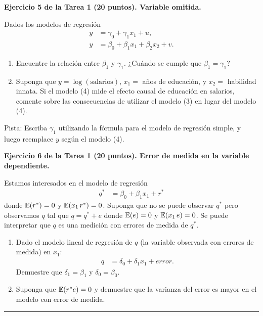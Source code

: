 \documentclass[letterpaper,11pt]{article}
\begin{document}
\vspace{1em}

\noindent\textbf{Ejercicio 5 de la Tarea 1 (20 puntos). Variable omitida.}

Dados los modelos de regresión
\begin{align}
    y &= \gamma_0+\gamma_1 x_{1}+u,\\
    y &= \beta_0 + \beta_1 x_{1}+\beta_2 x_{2}+v.
\end{align}
\begin{enumerate}
    \item Encuentre la relación entre $\beta_1$ y $\gamma_1$. ¿Cuándo se cumple que
    $\beta_1=\gamma_1$?
    \item Suponga que $y = \log(\text{salarios})$, $x_{1}=$ años de educación, y $x_{2}=$
    habilidad innata. Si el modelo (4) mide el efecto causal de educación en salarios, comente
    sobre las consecuencias de utilizar el modelo (3) en lugar del modelo (4).
\end{enumerate}
Pista: Escriba $\gamma_1$ utilizando la fórmula para el modelo de regresión simple, y luego
reemplace $y$ según el modelo (4).

\vspace{1em}

\noindent\textbf{Ejercicio 6 de la Tarea 1 (20 puntos). Error de medida en la variable
dependiente.}

Estamos interesados en el modelo de regresión
\begin{align*}
    q^* &= \beta_0 + \beta_1 x_{1}+r^*
\end{align*}
donde $\operatorname{\mathbb{E}}(r^*)=0$ y $\operatorname{\mathbb{E}}(x_1\,r^*)=0$. Suponga que no se puede observar $q^*$ pero observamos $q$
tal que $q=q^*+e$ donde $\operatorname{\mathbb{E}}(e)=0$ y $\operatorname{\mathbb{E}}(x_1\,e)=0$. Se puede interpretar que $q$ es una medición
con errores de medida de $q^*$.
\begin{enumerate}
    \item Dado el modelo lineal de regresión de $q$ (la variable observada con errores de
    medida) en $x_1$:
\begin{align*}
    q &= \delta_0 + \delta_1 x_{1}+error.
\end{align*}
    Demuestre que $\delta_1=\beta_1$ y $\delta_0=\beta_0$.
    \item Suponga que $\operatorname{\mathbb{E}}(r^* e)=0$ y demuestre que la varianza del error es mayor en el modelo
    con error de medida.\\
\end{enumerate}

\vspace{2em}
\noindent\rule{\textwidth}{0.4pt}
\end{document}
